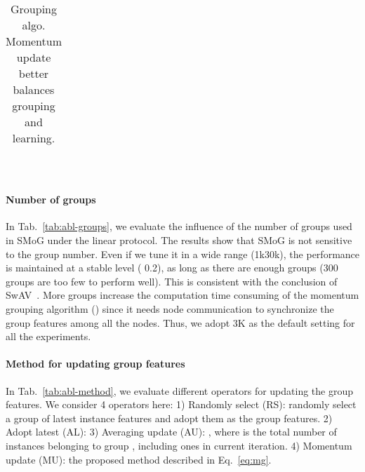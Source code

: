 \documentclass[runningheads]{style/llncs}
\begin{document}
\begin{table}
\begin{subtable}[t]{0.33\linewidth}
{\begin{tabular}{ l|c }
		\end{tabular}}
	\end{subtable}
	~
	\begin{subtable}[t]{0.45\linewidth}
		\centering
		\caption{Grouping algo. Momentum update better balances grouping and learning.}
		\label{tab:abl-method}
	\end{subtable}
	\label{tab:abl}
\end{table}

\paragraph{Number of groups}
In Tab.~\ref{tab:abl-groups}, we evaluate the influence of the number of groups used in SMoG under the linear protocol. The results show that SMoG is not sensitive to the group number. Even if we tune it in a wide range (1k30k), the performance is maintained at a stable level ( 0.2), as long as there are enough groups (300 groups are too few to perform well). This is consistent with the conclusion of SwAV~\cite{swav}. More groups increase the computation time consuming of the momentum grouping algorithm () since it needs node communication to synchronize the group features among all the nodes. Thus, we adopt 3K as the default setting for all the experiments.

\paragraph{Method for updating group features}
In Tab.~\ref{tab:abl-method}, we evaluate different operators for updating the group features. We consider 4 operators here: 1) Randomly select (RS): randomly select a group of latest instance features and adopt them as the group features. 2) Adopt latest (AL):  3) Averaging update (AU): 
, where  is the total number of instances belonging to group , including ones in current iteration.
4) Momentum update (MU): the proposed method described in Eq.~\ref{eq:mg}.
\end{document}
